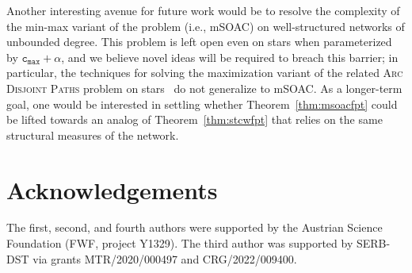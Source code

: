 \documentclass[letterpaper]{article} %
\newcommand{\mproblem}{{\sc mSOAC}\xspace} %
\newcommand{\cmax}{\mathtt{c_{max}}}
\begin{document}
Another interesting avenue for future work would be to resolve the complexity of the min-max variant of the problem (i.e., \mproblem) on well-structured networks of unbounded degree. This problem is left open even on stars when parameterized by $\cmax+\alpha$, and we believe novel ideas will be required to breach this barrier; in particular, the techniques for solving the maximization variant of the related \textsc{Arc Disjoint Paths} problem on stars~\cite{ErlebachJansen01} do not generalize to \mproblem. As a longer-term goal, one would be interested in settling whether Theorem~\ref{thm:msoacfpt} could be lifted towards an analog of Theorem~\ref{thm:stcwfpt} that relies on the same structural measures of the network.

\section{Acknowledgements}

The first, second, and fourth authors were supported by the Austrian Science Foundation (FWF, project Y1329). The third author was supported by SERB-DST via grants MTR/2020/000497 and CRG/2022/009400.



\end{document}
